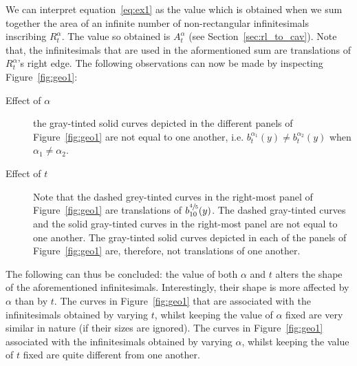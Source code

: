 \documentclass[twoside,reqno,11pt]{fcaa-var} %
\begin{document}
\noindent
We can interpret equation~\eqref{eq:ex1} as the value which is obtained when we sum together the area of an infinite number of non-rectangular infinitesimals inscribing $R_{t}^{\alpha}$. The value so obtained is $A_{t}^{\alpha}$ (see Section~\ref{sec:rl_to_cav}). Note that, the infinitesimals that are used in the aformentioned sum are translations of $R_{t}^{\alpha}$'s right edge. The following observations can now be made by inspecting Figure~\ref{fig:geo1}: 
\begin{description}
 \item[Effect of $\alpha$] the gray-tinted solid curves depicted in the different panels of Figure~\ref{fig:geo1} are not equal to one another, i.e. $b_{t}^{\alpha_1}(y)\neq b_{t}^{\alpha_2}(y)$ when $\alpha_1\neq\alpha_2$. 
 \item[Effect of $t$] Note that the dashed grey-tinted curves in the right-most panel of Figure~\ref{fig:geo1} are translations of $b_{10}^{\sfrac{4}{5}}(y)$. The dashed gray-tinted curves and the solid gray-tinted curves in the right-most panel are not equal to one another. The gray-tinted solid curves depicted in each of the panels of Figure~\ref{fig:geo1} are, therefore, not translations of one another. 
\end{description}
The following can thus be concluded: the value of both $\alpha$ and $t$ alters the shape of the aforementioned infinitesimals. Interestingly, their shape is more affected by $\alpha$ than by $t$. The curves in Figure~\ref{fig:geo1} that are associated with the infinitesimals obtained by varying $t$, whilst keeping the value of $\alpha$ fixed are very similar in nature (if their 
sizes are ignored). The curves in Figure~\ref{fig:geo1} associated with the infinitesimals obtained by varying $\alpha$, whilst keeping the value of $t$ fixed are quite different from one another.\\  

\end{document}

